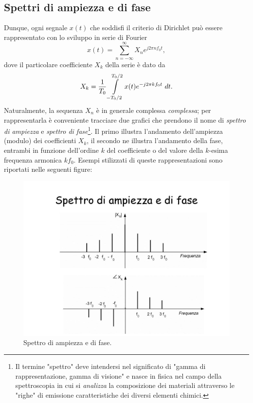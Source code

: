 \documentclass[12pt,oneside,openany]{memoir}
\numberwithin{equation}{subsection}
\newcommand{\dt}{\ dt}
\begin{document}
\subsection{Spettri di ampiezza e di fase}
Dunque, ogni segnale $x(t)$ che soddisfi il criterio di Dirichlet pu\`o essere rappresentato con lo sviluppo in serie di Fourier
\begin{equation}
	x(t) = \sum_{n = -\infty}^{\infty} X_n e^{j 2 \pi n f_0 t},
\end{equation}
dove il particolare coefficiente $X_k$ della serie \`e dato da
\begin{equation}
	X_k = \frac{1}{T_0} \int\displaylimits_{-T_0/2}^{T_0/2} x(t) e^{-j 2 \pi k f_0 t} \dt.
\end{equation}
Naturalmente, la sequenza $X_n$ \`e in generale complessa \textit{complessa}; per rappresentarla \`e conveniente tracciare due grafici che prendono il nome di \textit{spettro di ampiezza} e \textit{spettro di fase}\footnote{Il termine "spettro" deve intendersi nel significato di "gamma di rappresentazione, gamma di visione" e nasce in fisica nel campo della spettroscopia in cui si \textit{analizza} la composizione dei materiali attraverso le "righe" di emissione caratteristiche dei diversi elementi chimici.}. Il primo illustra l'andamento dell'ampiezza (modulo) dei coefficienti $X_k$, il secondo ne illustra l'andamento della fase, entrambi in funzione dell'ordine $k$ del coefficiente o del valore della $k$-esima frequenza armonica $k f_0$. Esempi stilizzati di queste rappresentazioni sono riportati nelle seguenti figure:
\begin{figure}[H]
\centering
\captionsetup{justification=centering}
\includegraphics[width=1.0\textwidth]{images/spettro_di_ampiezza_e_di_fase.jpg}
\caption{Spettro di ampiezza e di fase.}
\end{figure}
\end{document}

